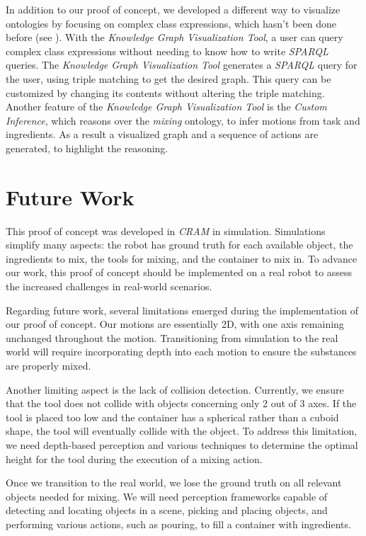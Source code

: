 In addition to our proof of concept, we developed a different way to visualize ontologies by focusing on complex class expressions, which hasn't been done before (see ). 
With the \textit{Knowledge Graph Visualization Tool}, a user can query complex class expressions without needing to know how to write \textit{SPARQL} queries. 
The \textit{Knowledge Graph Visualization Tool} generates a \textit{SPARQL} query for the user, using triple matching to get the desired graph. 
This query can be customized by changing its contents without altering the triple matching. Another feature of the \textit{Knowledge Graph Visualization Tool}
is the \textit{Custom Inference}, which reasons over the \textit{mixing} ontology, to infer motions from task and ingredients. As a result a visualized graph 
and a sequence of actions are generated, to highlight the reasoning.  

\section{Future Work}
This proof of concept was developed in \textit{CRAM} \cite{beetz10cram} in simulation. Simulations simplify many aspects: the robot has ground truth for each available object, the ingredients to mix, the tools for mixing, and the container to mix in. To advance our work, this proof of concept should be implemented on a real robot to assess the increased challenges in real-world scenarios.

Regarding future work, several limitations emerged during the implementation of our proof of concept. Our motions are essentially 2D, with one axis remaining unchanged throughout the motion. Transitioning from simulation to the real world will require incorporating depth into each motion to ensure the substances are properly mixed.

Another limiting aspect is the lack of collision detection. Currently, we ensure that the tool does not collide with objects concerning only 2 out of 3 axes. If the tool is placed too low and the container has a spherical rather than a cuboid shape, the tool will eventually collide with the object. To address this limitation, we need depth-based perception and various techniques to determine the optimal height for the tool during the execution of a mixing action.

Once we transition to the real world, we lose the ground truth on all relevant objects needed for mixing. We will need perception frameworks capable of detecting and locating objects in a scene, picking and placing objects, and performing various actions, such as pouring, to fill a container with ingredients.

